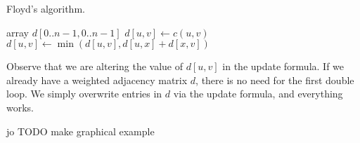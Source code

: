 \begin{algorithm}[H]
  \caption{Floyd's algorithm.}
  \label{alg:floydcode}
\begin{algorithmic}[1]
	\State array $d[0..n-1,0..n-1]$
			\State $d[u, v] \gets c(u, v)$
		\EndFor 
	\EndFor
				\State $d[u,v] \gets \min( d[u,v], d[u,x] + d[x,v] )$
			\EndFor
		\EndFor
	\EndFor
	\State {}
\EndFunction
\end{algorithmic}
\end{algorithm}


\begin{note}
Observe that we are altering the value of $d[u, v]$ in the update
formula. If we already have a weighted adjacency matrix $d$, there is
no need for the first double loop. We simply overwrite entries in $d$
via the update formula, and everything works.
\end{note}

jo TODO make graphical example

